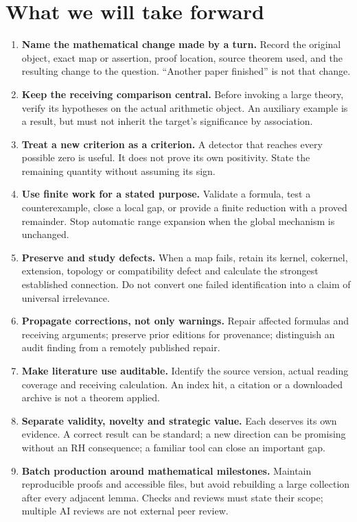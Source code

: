 \documentclass[
  british,
  11pt,
  a4paper,
]{article}
\providecommand{\tightlist}{%
  \setlength{\itemsep}{0pt}\setlength{\parskip}{0pt}}
\begin{document}
\section{What we will take forward}\label{what-we-will-take-forward}

\begin{enumerate}
\def\labelenumi{\arabic{enumi}.}
\tightlist
\item
  \textbf{Name the mathematical change made by a turn.} Record the
  original object, exact map or assertion, proof location, source
  theorem used, and the resulting change to the question. ``Another
  paper finished'' is not that change.
\item
  \textbf{Keep the receiving comparison central.} Before invoking a
  large theory, verify its hypotheses on the actual arithmetic object.
  An auxiliary example is a result, but must not inherit the target's
  significance by association.
\item
  \textbf{Treat a new criterion as a criterion.} A detector that reaches
  every possible zero is useful. It does not prove its own positivity.
  State the remaining quantity without assuming its sign.
\item
  \textbf{Use finite work for a stated purpose.} Validate a formula,
  test a counterexample, close a local gap, or provide a finite
  reduction with a proved remainder. Stop automatic range expansion when
  the global mechanism is unchanged.
\item
  \textbf{Preserve and study defects.} When a map fails, retain its
  kernel, cokernel, extension, topology or compatibility defect and
  calculate the strongest established connection. Do not convert one
  failed identification into a claim of universal irrelevance.
\item
  \textbf{Propagate corrections, not only warnings.} Repair affected
  formulas and receiving arguments; preserve prior editions for
  provenance; distinguish an audit finding from a remotely published
  repair.
\item
  \textbf{Make literature use auditable.} Identify the source version,
  actual reading coverage and receiving calculation. An index hit, a
  citation or a downloaded archive is not a theorem applied.
\item
  \textbf{Separate validity, novelty and strategic value.} Each deserves
  its own evidence. A correct result can be standard; a new direction
  can be promising without an RH consequence; a familiar tool can close
  an important gap.
\item
  \textbf{Batch production around mathematical milestones.} Maintain
  reproducible proofs and accessible files, but avoid rebuilding a large
  collection after every adjacent lemma. Checks and reviews must state
  their scope; multiple AI reviews are not external peer review.
\end{enumerate}
\end{document}
